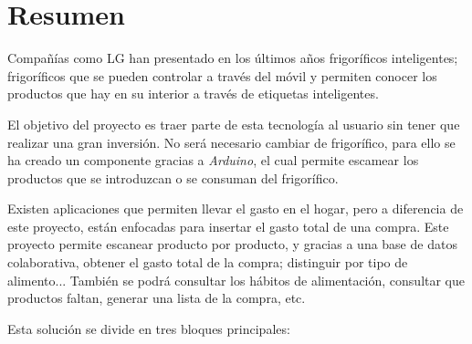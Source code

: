\chapter*{Resumen}

Compañías como LG han presentado en los últimos años frigoríficos inteligentes; frigoríficos que se pueden controlar a través del móvil y permiten conocer los productos que hay en su interior a través de etiquetas inteligentes.

El objetivo del proyecto es traer parte de esta tecnología al usuario sin tener que realizar una gran inversión. No será necesario cambiar de frigorífico, para ello se ha creado un componente gracias a \emph{Arduino}, el cual permite escamear los productos que se introduzcan o se consuman del frigorífico.

Existen aplicaciones que permiten llevar el gasto en el hogar, pero a diferencia de este proyecto, están enfocadas para insertar el gasto total de una compra. Este proyecto permite escanear producto por producto, y gracias a una base de datos colaborativa, obtener el gasto total de la compra; distinguir por tipo de alimento... También se podrá consultar los hábitos de alimentación, consultar que productos faltan, generar una lista de la compra, etc.

Esta solución se divide en tres bloques principales:

